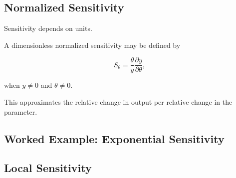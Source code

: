 \subsection{Normalized Sensitivity}
\label{subsec:normalized-sensitivity}

Sensitivity depends on units.

A dimensionless normalized sensitivity may be defined by

\[
\boxed{
S_\theta
=
\frac{\theta}{y}
\frac{\partial y}{\partial\theta},
}
\]

when \(y\neq0\) and \(\theta\neq0\).

This approximates the relative change in output per relative change in the
parameter.

\subsection{Worked Example: Exponential Sensitivity}
\label{subsec:worked-exponential-sensitivity}


\subsection{Local Sensitivity}
\label{subsec:local-sensitivity}

